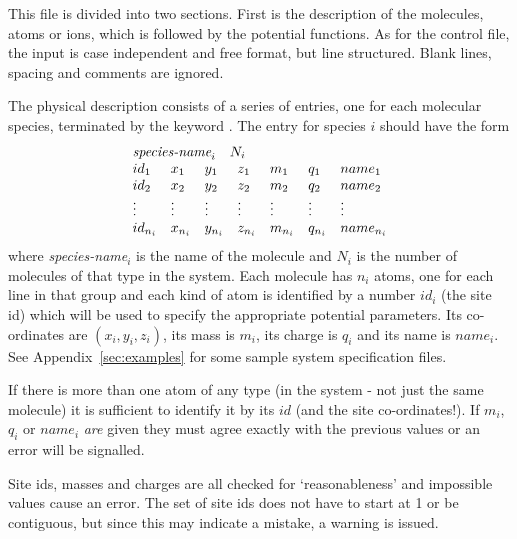 \documentclass[a4paper,twoside]{report}
\begin{document}
This file is divided into two sections.  First is the description of
the molecules, atoms or ions, which is followed by the potential
functions.  As for the control file, the input is case independent and
free format, but line structured. Blank lines, spacing and comments
are ignored.

The physical description consists of a series of entries, one for each
molecular species, terminated by the keyword . The entry
for species $i$ should have the form
\begin{displaymath}
\begin{array}{lllllll}
\multicolumn{7}{l}{\textit{species-name}_{i} \quad N_{i}}  \\
id_{1} & x_{1} & y_{1} & z_{1}&  m_{1} & q_{1} & name_{1} \\
id_{2} & x_{2} & y_{2} & z_{2}&  m_{2} & q_{2} & name_{2} \\
\vdots & \vdots & \vdots & \vdots & \vdots & \vdots & \vdots \\
id_{n_{i}} & x_{n_{i}} & y_{n_{i}} & z_{n_{i}}& 
m_{n_{i}} & q_{n_{i}} & name_{n_{i}} \\
\end{array}
\end{displaymath}
where \textit{species-name}$_{i}$ is the name of the molecule and $N_{i}$
is the number of molecules of that type in the system. Each molecule
has $n_{i}$ atoms, one for each line in that group and each kind of
atom is identified by a number $id_{i}$ (the site id) which will be
used to specify the appropriate potential parameters. Its co-ordinates
are $(x_{i},y_{i},z_{i})$, its mass is $m_{i}$, its charge is $q_{i}$
and its name is $name_{i}$.  See Appendix~\ref{sec:examples} for some
sample system specification files.

If there is more than one atom of any type (in the system - not just
the same molecule) it is sufficient to identify it by its $id$ (and
the site co-ordinates!).  If $m_{i}$, $q_{i}$ or $name_{i}$ \emph{are}
given they must agree exactly with the previous values or an error
will be signalled.

Site ids, masses and charges are all checked for `reasonableness'
and impossible values cause an error. The set of site ids does not
have to start at 1 or be contiguous, but since this may indicate a
mistake, a warning is issued.
\end{document}
